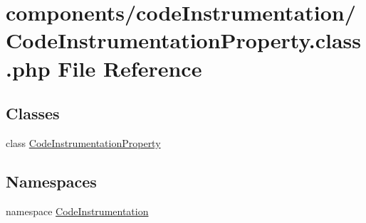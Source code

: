 \hypertarget{_code_instrumentation_property_8class_8php}{
\section{components/codeInstrumentation/CodeInstrumentationProperty.class.php File Reference}
\label{_code_instrumentation_property_8class_8php}
}
\subsection*{Classes}
\begin{CompactItemize}
\item 
class \hyperlink{class_code_instrumentation_property}{CodeInstrumentationProperty}
\end{CompactItemize}
\subsection*{Namespaces}
\begin{CompactItemize}
\item 
namespace \hyperlink{namespace_code_instrumentation}{CodeInstrumentation}
\end{CompactItemize}

